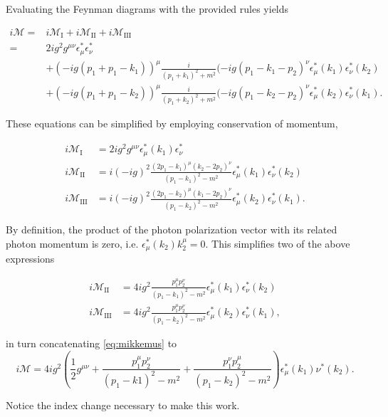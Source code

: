 \documentclass[11pt, a4paper]{amsart}
\begin{document}
Evaluating the Feynman diagrams with the provided rules yields

\begin{align}
i\mathcal{M} =& i\mathcal{M}_\text{I} + i\mathcal{M}_\text{II} + i\mathcal{M}_\text{III} \label{eq:mikkemus}\\
	=&  2ig^2 g^{\mu\nu} \epsilon_\mu^*\epsilon_\nu^* \nonumber \\
	 &+ (-ig (p_1 + p_1 - k_1))^\mu \frac{i}{(p_1 + k_1)^2 + m^2} (-ig(p_1 - k_1 - p_2)^\nu \epsilon_\mu^*(k_1)\epsilon_\nu^*(k_2) \nonumber\\
	 &+ (-ig (p_1 + p_1 - k_2))^\mu \frac{i}{(p_1 + k_2)^2 + m^2} (-ig(p_1 - k_2 - p_2)^\nu \epsilon_\mu^*(k_2)\epsilon_\nu^*(k_1). \nonumber
\end{align}

These equations can be simplified by employing conservation of momentum,

\begin{align}
i\mathcal{M}_{\text{I}} \ \ &= 2ig^2 g^{\mu\nu} \epsilon_\mu^*(k_1)\epsilon_\nu^* \\
i\mathcal{M}_{\text{II}} \  &= i(-ig)^2 \frac{(2p_1 - k_1)^\mu (k_2 - 2p_2)^\nu}{(p_1 - k_1)^2 - m^2} \epsilon_\mu^*(k_1)\epsilon_\nu^*(k_2) \\
i\mathcal{M}_{\text{III}}   &= i(-ig)^2 \frac{(2p_1 - k_2)^\mu (k_1 - 2p_2)^\nu}{(p_1 - k_2)^2 - m^2} \epsilon_\mu^*(k_2)\epsilon_\nu^*(k_1).
\end{align}

By definition, the product of the photon polarization vector with its related photon momentum is zero, i.e. $\epsilon_\mu^*(k_2)k_2^\mu = 0$. This simplifies two of the above expressions

\begin{align}
i\mathcal{M}_{\text{II}} \ &= 4ig^2 \frac{p_1^\mu p_2^\nu}{(p_1 - k_1)^2 - m^2}\epsilon_\mu^*(k_1) \epsilon_\nu^*(k_2) \\
i\mathcal{M}_{\text{III}}  &= 4ig^2 \frac{p_1^\mu p_2^\nu}{(p_1 - k_2)^2 - m^2}\epsilon_\mu^*(k_2) \epsilon_\nu^*(k_1),
\end{align}

in turn concatenating \autoref{eq:mikkemus} to 
\begin{equation}
i\mathcal{M} = 4ig^2 \left(\frac{1}{2}g^{\mu\nu} + \frac{p_1^\mu p_2^\nu}{(p_1 - k1)^2 - m^2} + \frac{p_1^\nu p_2^\mu}{(p_1- k_2)^2 - m^2} \right) \epsilon_\mu^*(k_1) \nu^*(k_2). 
\end{equation}

Notice the index change necessary to make this work.
\end{document}
